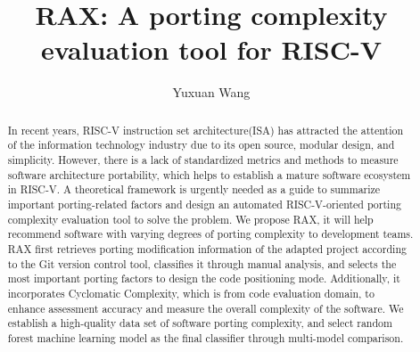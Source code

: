 \documentclass[sigconf,screen,review,anonymous]{acmart}
\begin{document}
\title{RAX: A porting complexity evaluation tool for RISC-V}

\author{Yuxuan Wang}

\renewcommand{\shortauthors}{Yuxuan et al.}

\begin{abstract}
In recent years, RISC-V instruction set architecture(ISA) has attracted the attention of the information technology industry due to its open source, modular design, and simplicity.
However, there is a lack of standardized metrics and methods to measure software architecture portability, which helps to establish a mature software ecosystem in RISC-V.
A theoretical framework is urgently needed as a guide to summarize important porting-related factors and design an automated RISC-V-oriented porting complexity evaluation tool to solve the problem.
We propose RAX, it will help recommend software with varying degrees of porting complexity to development teams.
RAX first retrieves porting modification information of the adapted project according to the Git version control tool, classifies it through manual analysis, and selects the most important porting factors to design the code positioning mode.
Additionally, it incorporates Cyclomatic Complexity, which is from code evaluation domain, to enhance assessment accuracy and measure the overall complexity of the software.
We establish a high-quality data set of software porting complexity, and select random forest machine learning model as the final classifier through multi-model comparison.
\end{abstract}
\end{document}
